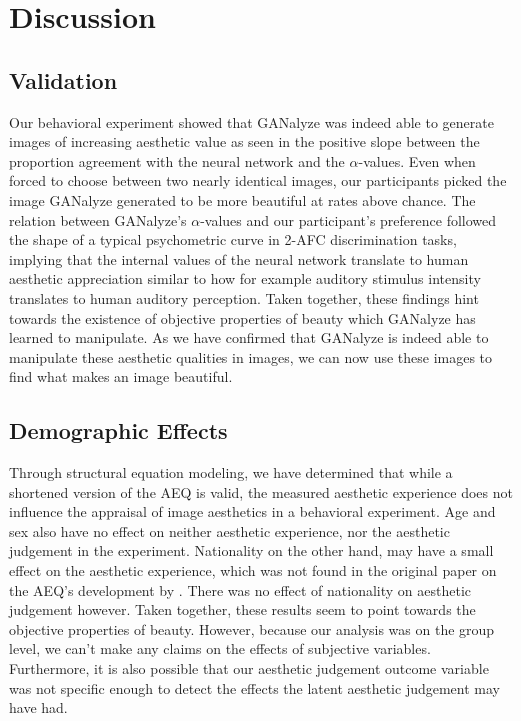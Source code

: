 \documentclass[../main.tex]{subfiles}
\begin{document}
\section{Discussion}

\subsection{Validation}
Our behavioral experiment showed that GANalyze was indeed able to generate images of increasing aesthetic value as seen in the positive slope between the proportion agreement with the neural network and the $\alpha$-values. Even when forced to choose between two nearly identical images, our participants picked the image GANalyze generated to be more beautiful at rates above chance. The relation between GANalyze's $\alpha$-values and our participant's preference followed the shape of a typical psychometric curve in 2-AFC discrimination tasks, implying that the internal values of the neural network translate to human aesthetic appreciation similar to how for example auditory stimulus intensity translates to human auditory perception. Taken together, these findings hint towards the existence of objective properties of beauty which GANalyze has learned to manipulate. As we have confirmed that GANalyze is indeed able to manipulate these aesthetic qualities in images, we can now use these images to find what makes an image beautiful.


\subsection{Demographic Effects}
Through structural equation modeling, we have determined that while a shortened version of the AEQ is valid, the measured aesthetic experience does not influence the appraisal of image aesthetics in a behavioral experiment. Age and sex also have no effect on neither aesthetic experience, nor the aesthetic judgement in the experiment. Nationality on the other hand, may have a small effect on the aesthetic experience, which was not found in the original paper on the AEQ’s development by \textcite{wanzerExperiencingFlowViewing2020}. There was no effect of nationality on aesthetic judgement however. Taken together, these results seem to point towards the objective properties of beauty. However, because our analysis was on the group level, we can't make any claims on the effects of subjective variables. Furthermore, it is also possible that our aesthetic judgement outcome variable was not specific enough to detect the effects the latent aesthetic judgement may have had.
\end{document}
